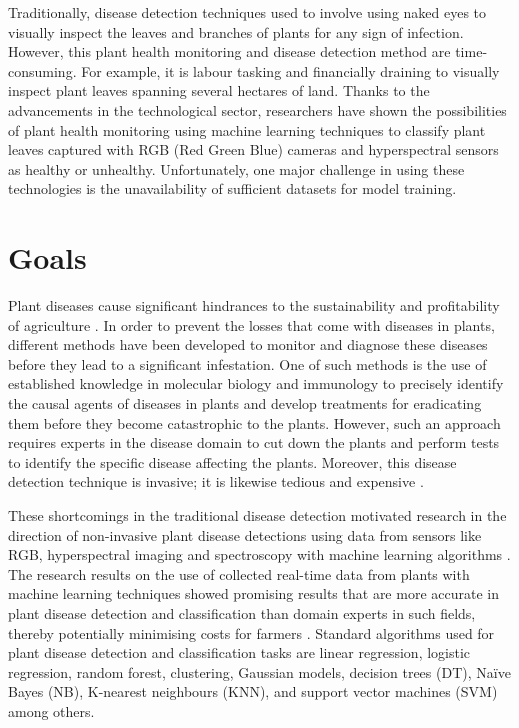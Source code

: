 Traditionally, disease detection techniques used to involve using naked eyes to visually inspect the leaves and branches of plants for any sign of infection. However, this plant health monitoring and disease detection method are time-consuming. For example, it is labour tasking and financially draining to visually inspect plant leaves spanning several hectares of land. Thanks to the advancements in the technological sector, researchers have shown the possibilities of plant health monitoring using machine learning techniques to classify plant leaves captured with RGB (Red Green Blue) cameras and hyperspectral sensors as healthy or unhealthy. Unfortunately, one major challenge in using these technologies is the unavailability of sufficient datasets for model training.




\section{Goals}
\label{sec:Goals}
Plant diseases cause significant hindrances to the sustainability and profitability of agriculture \cite{harvey2014extreme}. In order to prevent the losses that come with diseases in plants, different methods have been developed to monitor and diagnose these diseases before they lead to a significant infestation. One of such methods is the use of established knowledge in molecular biology and immunology to precisely identify the causal agents of diseases in plants and develop treatments for eradicating them before they become catastrophic to the plants. However, such an approach requires experts in the disease domain to cut down the plants and perform tests to identify the specific disease affecting the plants. Moreover, this disease detection technique is invasive; it is likewise tedious and expensive \cite{wang2017automatic}.

These shortcomings in the traditional disease detection motivated research in the direction of non-invasive plant disease detections using data from sensors like RGB, hyperspectral imaging and spectroscopy with machine learning algorithms \cite{mohanty2016using, ashourloo2016investigation, zhang2019deep}. The research results on the use of collected real-time data from plants with machine learning techniques showed promising results that are more accurate in plant disease detection and classification than domain experts in such fields, thereby potentially minimising costs for farmers \cite{barreto2020hyperspectral}. 
Standard algorithms used for plant disease detection and classification tasks are linear regression, logistic regression, random forest, clustering, Gaussian models, decision trees (DT), Naïve Bayes (NB), K-nearest neighbours (KNN), and support vector machines (SVM) among others.


